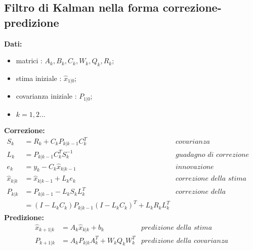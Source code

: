 \subsection{Filtro di Kalman nella forma correzione-predizione}
\textbf{Dati:}
\begin{itemize}
\item matrici : $A_k,B_k,C_k,W_k,Q_k,R_k$;
\item stima iniziale : $\hat{x}_{1|0}$; 
\item covarianza iniziale : $P_{1|0}$;
\item $k=1,2... $
\end{itemize}
\textbf{Correzione:}
\begin{align*}
S_k&=R_k+C_kP_{k|k-1}C_k^T &\textit{covarianza dell’innovazione}  \\
L_k&=P_{k|k-1}C_k^TS_k^{-1} &\textit{guadagno di correzione}  \\
e_k&=y_k-C_k\hat{x}_{k|k-1} &\textit{innovazione}  \\
\hat{x}_{k|k}&=\hat{x}_{k|k-1}+L_ke_k &\textit{correzione della stima}\\
P_{k|k}&=P_{k|k-1}-L_kS_kL_k^T &\textit{correzione della covarianza}\\
&=(I-L_kC_k)P_{k|k-1}(I-L_kC_k)^T+L_kR_kL_k^T
\end{align*}
\textbf{Predizione:}
\begin{align*}
\hat{x}_{k+1|k}&=A_k\hat{x}_{k|k}+b_k &\textit{predizione della stima}\\
P_{k+1|k}&=A_kP_{k|k}A_k^T+W_kQ_kW_k^T &\textit{predizione della covarianza}
\end{align*}
\newpage